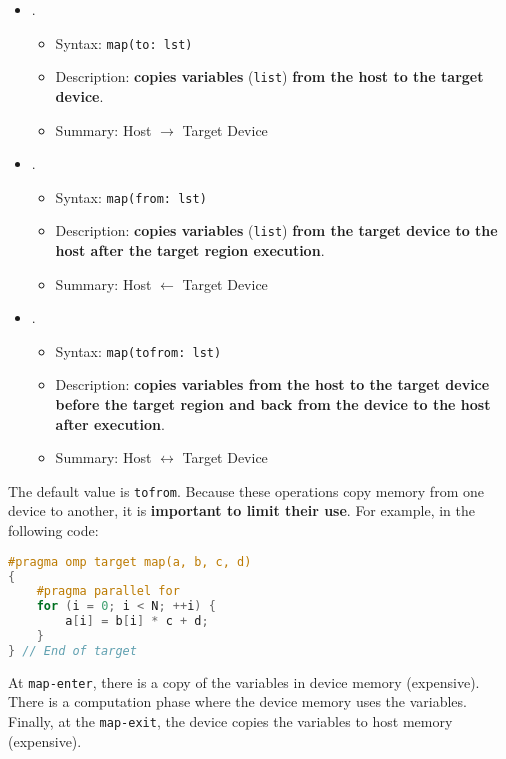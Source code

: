 \begin{itemize}
    \item {}.
    \begin{itemize}
        \item Syntax: \texttt{map(to: lst)}
        \item Description: \textbf{copies variables} (\texttt{list}) \textbf{from the host to the target device}.
        \item Summary: Host $\rightarrow$ Target Device
    \end{itemize}

    \item {}.
    \begin{itemize}
        \item Syntax: \texttt{map(from: lst)}
        \item Description: \textbf{copies variables} (\texttt{list}) \textbf{from the target device to the host after the target region execution}.
        \item Summary: Host $\leftarrow$ Target Device
    \end{itemize}

    \item {}.
    \begin{itemize}
        \item Syntax: \texttt{map(tofrom: lst)}
        \item Description: \textbf{copies variables from the host to the target device before the target region and back from the device to the host after execution}.
        \item Summary: Host $\leftrightarrow$ Target Device
    \end{itemize}
\end{itemize}
The default value is \texttt{tofrom}. Because these operations copy memory from one device to another, it is \textbf{important to limit their use}. For example, in the following code:
\begin{lstlisting}[language=C++]
#pragma omp target map(a, b, c, d)
{
    #pragma parallel for
    for (i = 0; i < N; ++i) {
        a[i] = b[i] * c + d;
    }
} // End of target
\end{lstlisting}
At \texttt{map-enter}, there is a copy of the variables in device memory (expensive). There is a computation phase where the device memory uses the variables. Finally, at the \texttt{map-exit}, the device copies the variables to host memory (expensive).

